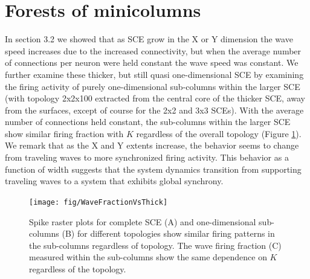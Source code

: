 \FloatBarrier
\section{Forests of minicolumns}
In section 3.2 we showed that as SCE grow in the X or Y dimension the wave speed increases due to the increased connectivity, but when the average number of connections per neuron were held constant the wave speed was constant.
We further examine these thicker, but still quasi one-dimensional SCE by examining the firing activity of purely one-dimensional sub-columns within the larger SCE (with topology 2x2x100 extracted from the central core of the thicker SCE, away from the surfaces, except of course for the 2x2 and 3x3 SCEs).
With the average number of connections held constant, the sub-columns within the larger SCE show similar firing fraction with $K$ regardless of the overall topology (Figure \ref{fig:LargeSCESubcolumns}).
We remark that as the X and Y extents increase, the behavior seems to change from traveling waves to more synchronized firing activity.
This behavior as a function of width suggests that the system dynamics transition from supporting traveling waves to a system that exhibits global synchrony.
\begin{figure}[!htb]
 \caption{ Spike raster plots for complete SCE (A) and one-dimensional sub-columns (B) for different topologies show similar firing patterns in the sub-columns regardless  of topology. 
           The wave firing fraction (C) measured within the sub-columns show the same dependence on $K$ regardless of the topology.}
   \texttt{[image: fig/WaveFractionVsThick]}
   \label{fig:LargeSCESubcolumns}
\end{figure}
\FloatBarrier

